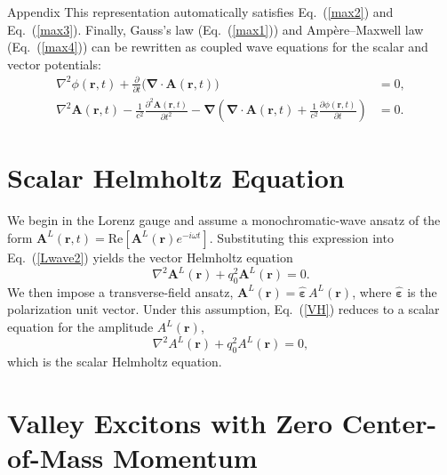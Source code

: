 \begin{Appx}{Appendix}
This representation automatically satisfies Eq.~(\ref{max2}) and Eq.~(\ref{max3}). Finally, Gauss's law (Eq.~(\ref{max1})) and Ampère–Maxwell law (Eq.~(\ref{max4})) can be rewritten as coupled wave equations for the scalar and vector potentials:
\begin{align}
\nabla^2 \phi(\boldsymbol{r}, t)
+
\frac{\partial}{\partial t}\big(\boldsymbol{\nabla}\cdot\boldsymbol{A}(\boldsymbol{r}, t)\big)
&= 0,
\\
\nabla^2 \boldsymbol{A}(\boldsymbol{r}, t)
-
\frac{1}{c^2}\frac{\partial^2 \boldsymbol{A}(\boldsymbol{r}, t)}{\partial t^2}
-
\boldsymbol{\nabla}\!\left(
\boldsymbol{\nabla}\cdot\boldsymbol{A}(\boldsymbol{r}, t)
+
\frac{1}{c^2}\frac{\partial \phi(\boldsymbol{r}, t)}{\partial t}
\right)
&= 0.
\end{align}



\section{Scalar Helmholtz Equation}
\label{ch:SHE}

We begin in the Lorenz gauge and assume a monochromatic-wave ansatz of the form
$\boldsymbol{A}^{L}(\boldsymbol{r},t)=\mathrm{Re}\!\left[\boldsymbol{A}^{L}(\boldsymbol{r})e^{-i\omega t}\right]$.
Substituting this expression into Eq.~(\ref{Lwave2}) yields the vector Helmholtz equation
\begin{equation}
\nabla^{2}\boldsymbol{A}^{L}(\boldsymbol{r})
+
q_{0}^{2}\boldsymbol{A}^{L}(\boldsymbol{r})
=0.
\label{VH}
\end{equation}
We then impose a transverse-field ansatz,
$\boldsymbol{A}^{L}(\boldsymbol{r})=\hat{\boldsymbol{\varepsilon}}\,A^{L}(\boldsymbol{r})$,
where $\hat{\boldsymbol{\varepsilon}}$ is the polarization unit vector. Under this assumption, Eq.~(\ref{VH}) reduces to a scalar equation for the amplitude $A^{L}(\boldsymbol{r})$,
\begin{equation}
\nabla^{2}A^{L}(\boldsymbol{r}) + q_{0}^{2}A^{L}(\boldsymbol{r}) = 0,
\end{equation}
which is the scalar Helmholtz equation.



\section{Valley Excitons with Zero Center-of-Mass Momentum}
\label{ch:ZERO}


\end{Appx}
